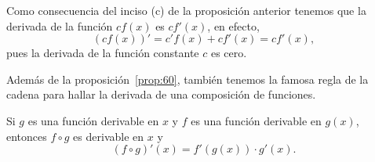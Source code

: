 \documentclass[12pt,a4paper]{book}
\begin{document}
    \begin{observacion}\label{obs:24}
        Como consecuencia del inciso (c) de la proposición anterior
        tenemos que la derivada de la función $cf(x)$ es $cf'(x)$, en efecto,
        \begin{equation*}
            (cf(x))'=c'f(x)+cf'(x)=cf'(x),
        \end{equation*}
        pues la derivada de la función constante $c$ es cero.
    \end{observacion}

    Además de la proposición~\ref{prop:60}, también tenemos la famosa regla de la cadena
    para hallar la derivada de una composición de funciones.

    \begin{proposicion}\label{prop:61}
        Si $g$ es una función derivable en $x$
        y $f$ es una función derivable en $g(x)$, entonces $f\circ g$ es derivable en $x$ y
        \begin{equation*}
            (f\circ g)'(x)=f'(g(x))\cdot g'(x).
        \end{equation*}
    \end{proposicion}
\end{document}
